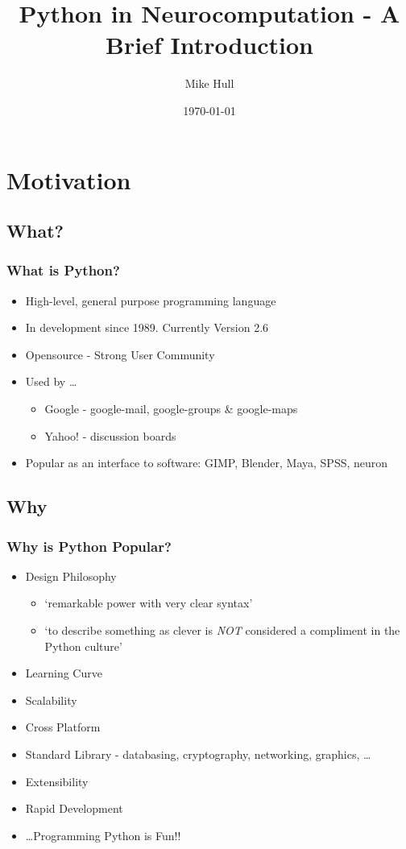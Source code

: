 \documentclass{beamer}
\title{Python in Neurocomputation - A Brief Introduction}
\author{Mike Hull}
\date{\today}
\begin{document}
\frame{\titlepage}

\section[Outline]{}
\frame{\tableofcontents}









\section{Motivation}
\subsection{What?}
\frame
{
  \frametitle{What is Python?}

  \begin{itemize}
  \item<1-> High-level, general purpose programming language
  \item<2-> In development since 1989. Currently Version 2.6
  \item<3-> Opensource - Strong User Community  
  \item<4-> Used by \ldots
	  \begin{itemize}
		  \item Google - google-mail, google-groups \& google-maps
		  \item Yahoo! - discussion boards
	  \end{itemize}
  \item<5-> Popular as an interface to software: GIMP, Blender, Maya, SPSS, neuron
  \end{itemize}
}


\subsection{Why}
\frame
{
  \frametitle{Why is Python Popular?}

  \begin{itemize}
  \item<1-> Design Philosophy
	  \begin{itemize}
	  \item<2-> `remarkable power with very clear syntax'
	  \item<3-> `to describe something as clever is \emph{NOT} considered a compliment in the Python culture'
	  \end{itemize}
  \item<4-> Learning Curve
  \item<5-> Scalability
  \item<6-> Cross Platform
  \item<7-> Standard Library - databasing, cryptography, networking, graphics, \ldots
  \item<8-> Extensibility
  \item<9-> Rapid Development
  \item<10-> \ldots Programming Python is Fun!! 
  \end{itemize}
}
\end{document}
